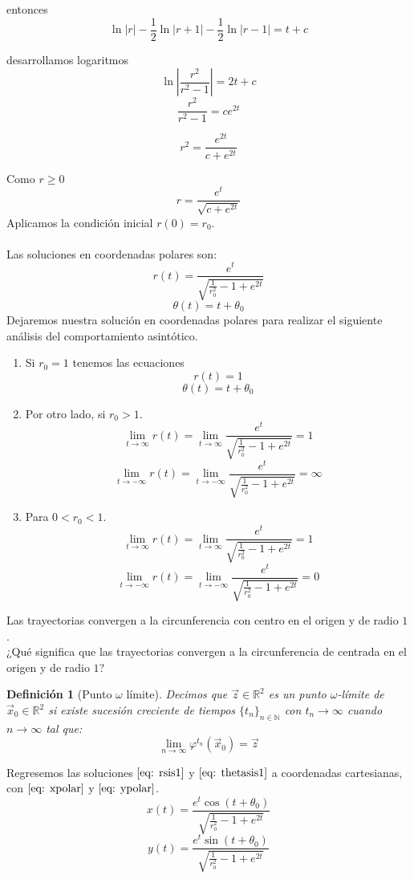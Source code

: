 \documentclass[12pt, a4paper]{report}
\newtheorem{definition}{Definición}
\begin{document}
entonces
$$\ln |r|-\frac{1}{2}\ln|r+1|-\frac{1}{2}\ln|r-1|=t+c$$

desarrollamos logaritmos
$$\ln\left\lvert\frac{r^2}{r^2-1}\right\rvert=2t+c$$
$$\frac{r^2}{r^2-1}=ce^{2t}$$

$$r^2=\frac{e^{2t}}{c+e^{2t}}$$

Como $r\geq 0$
$$r=\frac{e^t}{\sqrt{c+e^{2t}}}$$
Aplicamos la condición inicial $r(0)=r_0$.\\
\\Las soluciones en coordenadas polares son:
\begin{equation}\label{eq: rsis1}
	r(t)=\frac{e^t}{\sqrt{\frac{1}{r_0^2}-1+e^{2t}}}
\end{equation}
\begin{equation}\label{eq: thetasis1}
	\theta(t)=t+\theta_0
\end{equation}
Dejaremos nuestra solución en coordenadas polares para realizar el siguiente
análisis del comportamiento asintótico.\\
\begin{enumerate}
	\item Si $r_0=1$ tenemos las ecuaciones
	      $$r(t)=1$$
	      $$\theta(t)=t+\theta_0$$
	\item Por otro lado, si $r_0>1$.
	      $$\lim_{t\to\infty}r(t)=\lim_{t\to\infty}\frac{e^t}{\sqrt{\frac{1}{r_0^2}-1+e^{2t}}}=1$$
	      $$\lim_{t\to-\infty}r(t)=\lim_{t\to-\infty}\frac{e^t}{\sqrt{\frac{1}{r_0^2}-1+e^{2t}}}=\infty$$
	\item Para $0<r_0<1$.
	      $$\lim_{t\to\infty}r(t)=\lim_{t\to\infty}\frac{e^t}{\sqrt{\frac{1}{r_0^2}-1+e^{2t}}}=1$$
	      $$\lim_{t\to-\infty}r(t)=\lim_{t\to-\infty}\frac{e^t}{\sqrt{\frac{1}{r_0^2}-1+e^{2t}}}=0$$
\end{enumerate}
Las trayectorias convergen a la circunferencia con centro en el origen
y de radio  $1$.\\

¿Qué significa que las trayectorias convergen a la circunferencia de centrada en el origen y de radio $1$?

\begin{definition} [Punto $\omega$ límite]
	Decimos que $\vec{z}\in\mathbb{R}^2$ es un punto $\omega$-límite
	de $\vec{x}_0\in\mathbb{R}^2$ si existe sucesión creciente de
	tiempos $\{t_n\}_{n\in\mathbb{N}}$
	con $t_n \to\infty$ cuando $n\to \infty$ tal que:
	$$\lim_{n\to\infty}\varphi^{t_n}(\vec{x}_0)=\vec{z}$$
\end{definition}

Regresemos las soluciones $\eqref{eq: rsis1}$ y $\eqref{eq: thetasis1}$ a
coordenadas cartesianas, con $\eqref{eq: xpolar}$ y $\eqref{eq: ypolar}$.
\begin{equation}\label{eq: xsis1}
	x(t)=\frac{e^t\cos(t+\theta_0)}{\sqrt{\frac{1}{r_0^2}-1+e^{2t}}}
\end{equation}
\begin{equation}\label{eq: ysis1}
	y(t)=\frac{e^t\sin(t+\theta_0)}{\sqrt{\frac{1}{r_0^2}-1+e^{2t}}}
\end{equation}
\end{document}
